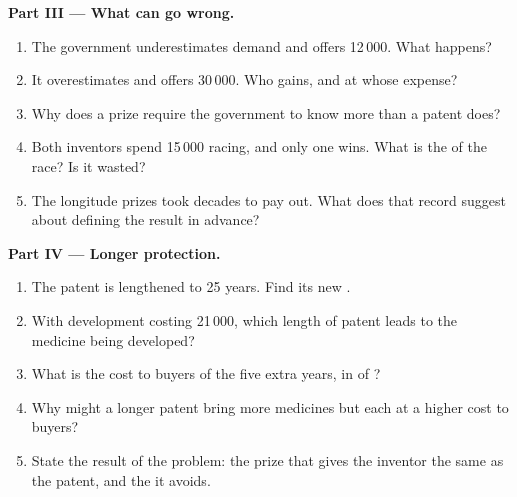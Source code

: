 \begin{problem}
\medskip
\noindent\textbf{Part III --- What can go wrong.}
\begin{enumerate}[resume]
\item The government underestimates demand and offers 12\,000. What happens?
\item It overestimates and offers 30\,000. Who gains, and at whose expense?
\item Why does a prize require the government to know more than a patent does?
\item Both inventors spend 15\,000 racing, and only one wins. What is the  of the race? Is it wasted?
\item The longitude prizes took decades to pay out. What does that record suggest about defining the result in advance?
\end{enumerate}

\medskip
\noindent\textbf{Part IV --- Longer protection.}
\begin{enumerate}[resume]
\item The patent is lengthened to 25 years. Find its new .
\item With development costing 21\,000, which length of patent leads to the medicine being developed?
\item What is the cost to buyers of the five extra years, in  of ?
\item Why might a longer patent bring more medicines but each at a higher cost to buyers?
\item State the result of the problem: the prize that gives the inventor the same  as the patent, and the  it avoids.
\end{enumerate}
\end{problem}
